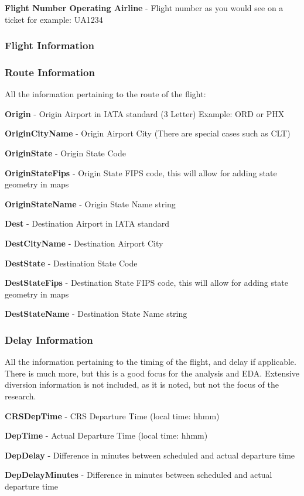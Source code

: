 \documentclass[a4paper,12pt]{article}
\begin{document}
\textbf{Flight Number Operating Airline} - Flight number as you would see on a ticket for example: UA1234

\subsubsection{Flight Information}

\subsubsection{Route Information}
All the information pertaining to the route of the flight:

\textbf{Origin} - Origin Airport in IATA standard (3 Letter) Example: ORD or PHX

\textbf{OriginCityName} - Origin Airport City (There are special cases such as CLT)

\textbf{OriginState} - Origin State Code

\textbf{OriginStateFips} - Origin State FIPS code, this will allow for adding state geometry in maps

\textbf{OriginStateName} - Origin State Name string

\textbf{Dest} - Destination Airport in IATA standard

\textbf{DestCityName} - Destination Airport City

\textbf{DestState} - Destination State Code

\textbf{DestStateFips} - Destination State FIPS code, this will allow for adding state geometry in maps

\textbf{DestStateName} - Destination State Name string

\subsubsection{Delay Information}
All the information pertaining to the timing of the flight, and delay if applicable. There is much more, but this is a good focus for the analysis and EDA.
Extensive diversion information is not included, as it is noted, but not the focus of the research.

\textbf{CRSDepTime} - CRS Departure Time (local time: hhmm)

\textbf{DepTime} - Actual Departure Time (local time: hhmm)

\textbf{DepDelay} - Difference in minutes between scheduled and actual departure time

\textbf{DepDelayMinutes} - Difference in minutes between scheduled and actual departure time
\end{document}
